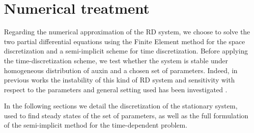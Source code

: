 \section{Numerical treatment}\label{sec:num_cap2}

Regarding the numerical approximation of the RD system, we choose to solve the two partial differential equations using the Finite Element method for the space discretization and a semi-implicit scheme for time discretization. Before applying the time-discretization scheme, we test whether the system is stable under homogeneous distribution of auxin and a chosen set of parameters. Indeed, in previous works the instability of this kind of RD system and sensitivity with respect to the parameters and general setting used has been investigated \cite{intra1_R, phdthesis:victor}.

In the following sections we detail the discretization of the stationary system, used to find steady states of the set of parameters, as well as the full formulation of the semi-implicit method for the time-dependent problem.

